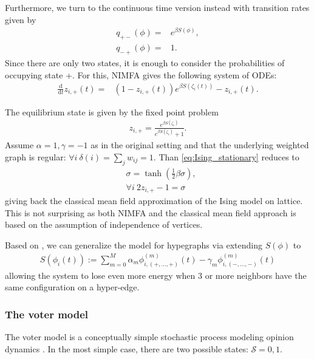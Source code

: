 \documentclass{article}
\renewcommand{\d}{\mathrm{d}}
\newcommand{\1}[1]{{\mathds{1}}_{\left\{#1\right\}}}
\renewcommand{\S}{\mathcal{S}}
\begin{document}
	Furthermore, we turn to the continuous time version instead with transition rates given by
	\begin{align*}
		q_{+-}(\phi)=&e^{\beta S(\phi)}, \\
		q_{-+}(\phi)=&1.
	\end{align*}
	Since there are only two states, it is enough to consider the probabilities of occupying state +. For this, NIMFA gives the following system of ODEs:
	\begin{align}
	\label{eq:NIMFA_Ising}
	\frac{\d}{\d t} z_{i,+}(t)=&(1-z_{i,+}(t))e^{\beta S(\zeta_i(t))}-z_{i,+}(t).
	\end{align}
	
The equilibrium state is given by the fixed point problem
	\begin{align}
	\label{eq:Ising_stationary}
	 z_{i,+}=\frac{e^{\beta S(\zeta_i)}}{e^{\beta S(\zeta_i)}+1}.
	\end{align}
	Assume $\alpha=1,\gamma=-1$ as in the original setting and that the underlying weighted graph is regular: $\forall i \ \delta(i)=\sum_{j} w_{ij}=1$. Than \eqref{eq:Ising_stationary} reduces to
	\begin{align*}
	&\sigma=\tanh \left(\frac{1}{2}\beta \sigma \right), \\
	&\forall i \ 2 z_{i,+}-1=\sigma
	\end{align*}
	giving back the classical mean field approximation of the Ising model on lattice. This is not surprising as both NIMFA and the classical mean field approach is based on the assumption of independence of vertices.
	
	Based on \cite{Glauber_ODE}, we can generalize the model for hypegraphs via extending $S(\phi)$ to
	\begin{align*}
	S(\phi_i(t)):=\sum_{m=0}^{M} \alpha_m \phi_{i,(+,\dots,+)}^{(m)}(t)-\gamma_m \phi_{i,(-,\dots,-)}^{(m)}(t)
	\end{align*}
	allowing the system to lose even more energy when $3$ or more neighbors have the same configuration on a hyper-edge. 

	\subsubsection*{The voter model}

	The voter model is a conceptually simple stochastic process modeling opinion dynamics \cite{voter_majority}. In the most simple case, there are two possible states: $\S={0,1}.$%
	
\end{document}
